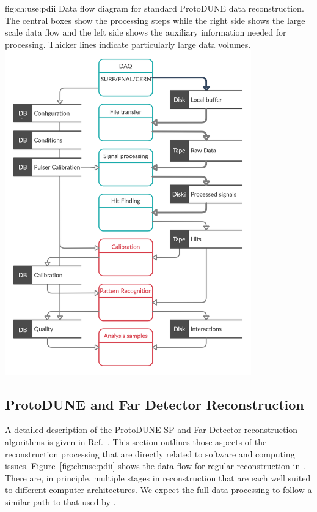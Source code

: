 \documentclass[../main-v1.tex]{subfiles}
\begin{document}
\begin{dunefigure}
{fig:ch:use:pdii}
{Data flow diagram for standard ProtoDUNE data reconstruction. The central boxes show the processing steps while the right side shows the large scale data flow  and the left side shows the auxiliary information needed for processing. Thicker lines indicate particularly large data volumes.}
\includegraphics[width=0.8\textwidth]{graphics/IntroFigures/Data_processing_FD_v3.png}
\end{dunefigure}

\subsection{ProtoDUNE and Far Detector Reconstruction}\label{sec:use:pdii}

A detailed description of the ProtoDUNE-SP and Far Detector reconstruction algorithms is given in Ref.~\cite{DUNE:2020ypp}.  This section outlines those aspects of the reconstruction processing that are directly related to software and computing issues.
Figure~\ref{fig:ch:use:pdii} shows the data flow for regular reconstruction in .  %
There are, in principle,  multiple stages in reconstruction that are each well suited to different computer architectures.  We expect the full  data processing to follow a similar path to that used by .  
\end{document}
